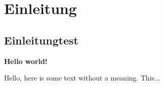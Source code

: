\chapter{Einleitung}
\section{Einleitungtest}

\textbf{Hello world!}
 
Hello, here is some text without a meaning.  This... 
